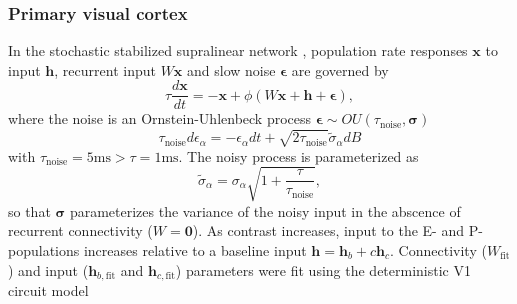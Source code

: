 \documentclass[11pt]{article}
\begin{document}
\subsubsection{Primary visual cortex}\label{methods_V1}
In the stochastic stabilized supralinear network \cite{hennequin2018dynamical}, population rate responses $\mathbf{x}$ to input $\mathbf{h}$, recurrent input $W\mathbf{x}$ and slow noise $\bm{\epsilon}$ are governed by
\begin{equation}
    \tau \frac{d\mathbf{x}}{dt} = -\mathbf{x} +\phi(W\mathbf{x} + \mathbf{h} + \bm{\epsilon}),
\end{equation}
where the noise is an Ornstein-Uhlenbeck process $\bm{\epsilon} \sim OU(\tau_{\text{noise}}, \bm{\sigma})$
\begin{equation}
\tau_{\text{noise}} d\epsilon_\alpha = -\epsilon_\alpha dt + \sqrt{2\tau_{\text{noise}}}\tilde{\sigma}_\alpha dB
\end{equation}
with $\tau_{\text{noise}} = 5\text{ms} > \tau = 1\text{ms}$.
The noisy process is parameterized as
\begin{equation}
\tilde{\sigma}_\alpha = \sigma_\alpha \sqrt{1 + \frac{\tau}{\tau_{\text{noise}}}},
\end{equation}
so that $\bm{\sigma}$ parameterizes the variance of the noisy input in the abscence of recurrent connectivity ($W = \bm{0}$).
As contrast increases, input to the E- and P-populations increases  relative to a baseline input $\mathbf{h} = \mathbf{h}_b + c\mathbf{h}_c$.
Connectivity ($W_{\text{fit}}$) and input ($\mathbf{h}_{b,\text{fit}}$ and $\mathbf{h}_{c,\text{fit}}$) parameters were fit using the deterministic V1 circuit model \cite{palmigiano2020structure} 
\end{document}
